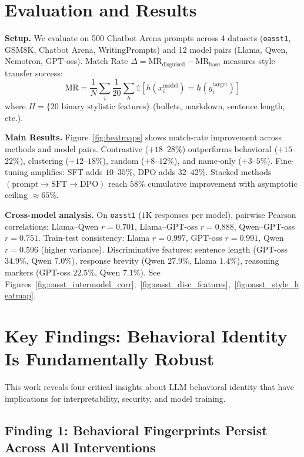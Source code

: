 \documentclass{article}
\begin{document}
\section{Evaluation and Results}
\textbf{Setup.} We evaluate on 500 Chatbot Arena prompts \citep{chiang2024chatbot} across 4 datasets (\texttt{oasst1}, GSM8K, Chatbot Arena, WritingPrompts) and 12 model pairs (Llama, Qwen, Nemotron, GPT-oss). Match Rate $\Delta = \text{MR}_{\text{disguised}} - \text{MR}_{\text{base}}$ measures style transfer success:
\[
\text{MR} = \frac{1}{N}\sum_{i} \frac{1}{20}\sum_{h} \mathbb{1}\!\left[h(x_i^{\text{model}}) = h(y_i^{\text{target}})\right]
\]
where $H = \{20 \text{ binary stylistic features}\}$ (bullets, markdown, sentence length, etc.).

\textbf{Main Results.} Figure~\ref{fig:heatmaps} shows match-rate improvement across methods and model pairs. Contrastive ($+18$--$28\%$) outperforms behavioral ($+15$--$22\%$), clustering ($+12$--$18\%$), random ($+8$--$12\%$), and name-only ($+3$--$5\%$). Fine-tuning amplifies: SFT adds $10$--$35\%$, DPO adds $32$--$42\%$. Stacked methods $(\text{prompt} \to \text{SFT} \to \text{DPO})$ reach $58\%$ cumulative improvement with asymptotic ceiling ${\approx}65\%$.

\textbf{Cross-model analysis.} On \texttt{oasst1} ($1$K responses per model), pairwise Pearson correlations: Llama--Qwen $r=0.701$, Llama--GPT-oss $r=0.888$, Qwen--GPT-oss $r=0.751$. Train-test consistency: Llama $r=0.997$, GPT-oss $r=0.991$, Qwen $r=0.596$ (higher variance). Discriminative features: sentence length (GPT-oss $34.9\%$, Qwen $7.0\%$), response brevity (Qwen $27.9\%$, Llama $1.4\%$), reasoning markers (GPT-oss $22.5\%$, Qwen $7.1\%$). See Figures~\ref{fig:oasst_intermodel_corr},~\ref{fig:oasst_disc_features},~\ref{fig:oasst_style_heatmap}.


\section{Key Findings: Behavioral Identity Is Fundamentally Robust}

This work reveals four critical insights about LLM behavioral identity that have implications for interpretability, security, and model training.

\subsection*{Finding 1: Behavioral Fingerprints Persist Across All Interventions}
\end{document}
